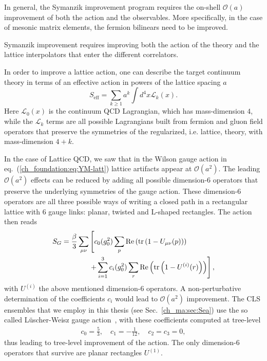 In general, the Symanzik improvement program requires the on-shell $\mathcal{O}(a)$ improvement of both the action and the observables.
More specifically, in the case of mesonic matrix elements, the fermion bilinears need to be improved.

Symanzik improvement requires improving both the action of the theory and the lattice interpolators that enter the different correlators. 

In order to improve a lattice action, one can describe the target continuum theory in terms of an effective action in powers of the lattice spacing $a$
\begin{equation}
S_{\textrm{eff}}=\sum_{k\geq1}a^k\int d^4x\mathcal{L}_k(x).
\end{equation}
Here $\mathcal{L}_0(x)$ is the continuum QCD Lagrangian, which has mass-dimension $4$, while the $\mathcal{L}_k$ terms are all possible Lagrangians built from fermion and gluon field operators that preserve the symmetries of the regularized, i.e. lattice, theory, with mass-dimension $4+k$.

In the case of Lattice QCD, we saw that in the Wilson gauge action in eq.~(\ref{ch_foundation:eq:YM-latt}) lattice artifacts appear at $\mathcal{O}(a^2)$. The leading $\mathcal{O}(a^2)$ effects can be reduced by adding all possible dimension-$6$ operators that preserve the underlying symmetries of the gauge action. These dimension-6 operators are all three possible ways of writing a closed path in a rectangular lattice with 6 gauge links: planar, twisted and L-shaped rectangles. The action then reads
\begin{align}
\label{ch_foundation:eq:SG_impr}
S_G=\frac{\beta}{3}\sum_{\mu\nu}&\left[c_0(g_0^2)\sum_p{\textrm{Re}}\left({\textrm{tr}}\left(1-U_{\mu\nu}(p)\right)\right)\right. \notag \\
&\left.+\sum_{i=1}^3c_i(g_0^2)\sum_r{\textrm{Re}}\left({\textrm{tr}}\left(1-U^{(i)}(r)\right)\right)\right],
\end{align}
with $U^{(i)}$ the above mentioned dimension-6 operators. A non-perturbative determination of the coefficients $c_i$ would lead to $\mathcal{O}(a^2)$ improvement. The CLS ensembles that we employ in this thesis (see Sec.~\ref{ch_ma:sec:Sea}) use the so called Lüscher-Weisz gauge action~\citep{Luscher:1984xn,Luscher:1985zq}, with these coefficients computed at tree-level
\begin{gather}
\label{ch_foundation:eq:LW}
c_0=\frac{5}{3}, \quad
c_1=-\frac{1}{12}, \quad
c_2=c_3=0,
\end{gather}
thus leading to tree-level improvement of the action. The only dimension-6 operators that survive are planar rectangles $U^{(1)}$.

